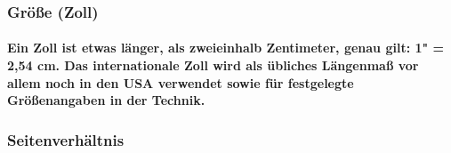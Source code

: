 \documentclass[a4paper]{article}
\begin{document}
    \subsubsection{\color{codegreen}Größe (Zoll)}

    \paragraph{\color{codegreen} Ein Zoll ist etwas länger, als zweieinhalb Zentimeter, genau gilt: 1" = 2,54 cm. Das internationale Zoll wird als übliches Längenmaß vor allem noch in den USA verwendet sowie für festgelegte Größenangaben in der Technik.}

    \subsubsection{\color{codegreen}Seitenverhältnis}
\end{document}
